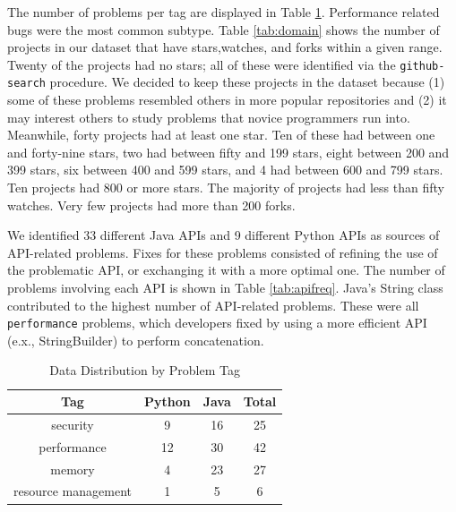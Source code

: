 \documentclass[sigconf]{acmart}
\begin{document}
The number of problems per tag are displayed in Table \ref{tab:tag}. Performance related bugs were the most common subtype. Table \ref{tab:domain} shows the number of projects in our dataset that have stars,watches, and forks within a given range. Twenty of the projects had no stars; all of these were identified via the \texttt{github-search} procedure. We decided to keep these projects in the dataset because (1) some of these problems resembled others in more popular repositories and (2) it may interest others to study problems that novice programmers run into. Meanwhile, forty projects had at least one star. Ten of these had between one and forty-nine stars, two had between fifty and 199 stars, eight between 200 and 399 stars, six between 400 and 599 stars, and 4 had between 600 and 799 stars. Ten projects had 800 or more stars. The majority of projects had less than fifty watches. Very few projects had more than 200 forks.

We identified 33 different Java APIs and 9 different Python APIs as sources of API-related problems. Fixes for these problems consisted of refining the use of the problematic API, or exchanging it with a more optimal one. The number of problems involving each API is shown in Table \ref{tab:apifreq}. Java's String class contributed to the highest number of API-related problems. These were all \texttt{performance} problems, which developers fixed by using a more efficient API (e.x., StringBuilder) to perform concatenation.
\begin{table}
  \caption{Data Distribution by Problem Tag}
  \label{tab:tag}
\begin{tabular}{  c c c c }
  \toprule
  Tag  				&Python &Java & Total\\
  \midrule
  security				& 9 &16 &25 \\
  performance			&12 &30 &42 \\
  memory				& 4 &23 &27 \\
  resource management	& 1 & 5&  6 \\
  \bottomrule
\end{tabular}
\end{table}
\end{document}
